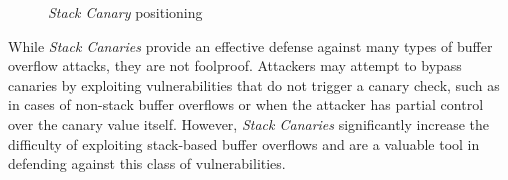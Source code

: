 \begin{figure}
  \centering
  \def\stackalignment{r} %
  {\scriptsize \parbox[t]{\linewidth}{}}
  \caption{\textit{Stack Canary} positioning}
  \label{fig:canary}
\end{figure}

While \textit{Stack Canaries} provide an effective defense against many types of
buffer overflow attacks, they are not foolproof. Attackers may attempt to bypass
canaries by exploiting vulnerabilities that do not trigger a canary check, such
as in cases of non-stack buffer overflows or when the attacker has partial
control over the canary value itself. However, \textit{Stack Canaries} significantly
increase the difficulty of exploiting stack-based buffer overflows and are a valuable
tool in defending against this class of vulnerabilities.

